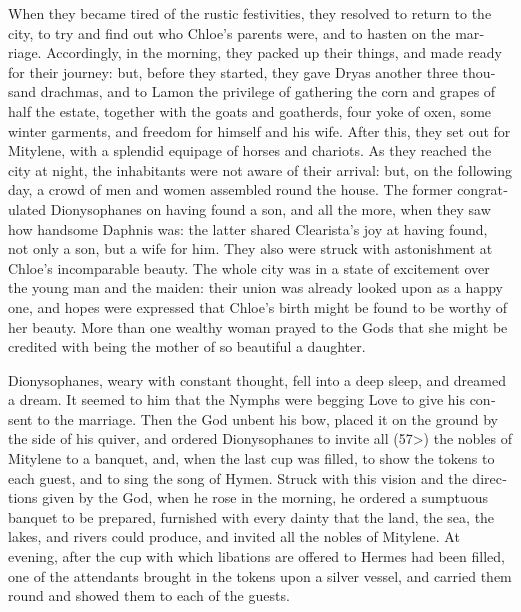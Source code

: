 \documentclass{book}
\begin{document}
\begin{pairs}
\begin{Rightside}
\begin{english}
  When they became tired of the rustic festivities, they resolved to return to the city, to try and find out who Chloe's parents were, and to hasten on the marriage.  Accordingly, in the morning, they packed up their things, and made ready for their journey: but, before they started, they gave Dryas another three thousand drachmas, and to Lamon the privilege of gathering the corn and grapes of half the estate, together with the goats and goatherds, four yoke of oxen, some winter garments, and freedom for himself and his wife.  After this, they set out for Mitylene, with a splendid equipage of horses and chariots.  As they reached the city at night, the inhabitants were not aware of their arrival: but, on the following day, a crowd of men and women assembled round the house.  The former congratulated Dionysophanes on having found a son, and all the more, when they saw how handsome Daphnis was: the latter shared Clearista's joy at having found, not only a son, but a wife for him.  They also were struck with astonishment at Chloe's incomparable beauty.  The whole city was in a state of excitement over the young man and the maiden: their union was already looked upon as a happy one, and hopes were expressed that Chloe's birth might be found to be worthy of her beauty.  More than one wealthy woman prayed to the Gods that she might be credited with being the mother of so beautiful a daughter.
\pend


  Dionysophanes, weary with constant thought, fell into a deep sleep, and dreamed a dream.  It seemed to him that the Nymphs were begging Love to give his consent to the marriage.  Then the God unbent his bow, placed it on the ground by the side of his quiver, and ordered Dionysophanes to invite all (57>) the nobles of Mitylene to a banquet, and, when the last cup was filled, to show the tokens to each guest, and to sing the song of Hymen.  Struck with this vision and the directions given by the God, when he rose in the morning, he ordered a sumptuous banquet to be prepared, furnished with every dainty that the land, the sea, the lakes, and rivers could produce, and invited all the nobles of Mitylene.  At evening, after the cup with which libations are offered to Hermes had been filled, one of the attendants brought in the tokens upon a silver vessel, and carried them round and showed them to each of the guests.
\pend



\end{english}
\end{Rightside}
\end{pairs}
\end{document}
